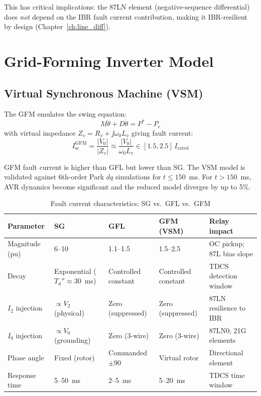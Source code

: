 This has critical implications: the 87LN element (negative-sequence
differential) does \emph{not} depend on the IBR fault current contribution,
making it IBR-resilient by design (Chapter~\ref{ch:line_diff}).

\section{Grid-Forming Inverter Model}
\label{sec:ch3_gfm}

\subsection{Virtual Synchronous Machine (VSM)}

The GFM emulates the swing equation:
\begin{equation}
  M\ddot{\theta} + D\dot{\theta} = P^\ast - P_e
\end{equation}
with virtual impedance $Z_v = R_v + \jj\omega_0 L_v$ giving fault current:
\begin{equation}
  I_\mathrm{sc}^\mathrm{GFM} = \frac{|V_0|}{|Z_v|} \approx \frac{|V_0|}{\omega_0 L_v}
  \in [1.5, 2.5]\,I_\mathrm{rated}
\end{equation}

GFM fault current is higher than GFL but lower than SG. The VSM model
is validated against 6th-order Park $dq$ simulations for $t \leq 150$~ms.
For $t > 150$~ms, AVR dynamics become significant and the reduced model
diverges by up to 5\%.

\begin{table}[htbp]
\caption{Fault current characteristics: SG vs.\ GFL vs.\ GFM}
\label{tab:ch3_fault_comparison}
\begin{tabularx}{\textwidth}{@{}lp{3cm}p{3cm}p{3cm}X@{}}
\toprule
Parameter & SG & GFL & GFM (VSM) & Relay impact \\
\midrule
Magnitude (pu) & 6--10 & 1.1--1.5 & 1.5--2.5
  & OC pickup; 87L bias slope \\
Decay & Exponential ($T_d'' \!\approx\! 30$~ms) & Controlled constant
  & Controlled constant
  & TDCS detection window \\
$I_2$ injection & $\propto V_2$ (physical) & Zero (suppressed)
  & Zero (suppressed)
  & 87LN resilience to IBR \\
$I_0$ injection & $\propto V_0$ (grounding) & Zero (3-wire)
  & Zero (3-wire)
  & 87LN0; 21G elements \\
Phase angle & Fixed (rotor) & Commanded $\pm 90$
  & Virtual rotor
  & Directional element \\
Response time & 5--50~ms & 2--5~ms & 5--20~ms
  & TDCS time window \\
\bottomrule
\end{tabularx}
\end{table}

